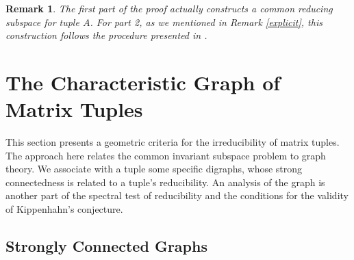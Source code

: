\documentclass[draft, 12pt, reqno]{amsart}
\numberwithin{equation}{section}
\theoremstyle{plain}
\newtheorem{remark}[theorem]{Remark}
\begin{document}
\begin{remark} \normalfont The first part of the proof actually constructs a common reducing subspace for tuple $A$. For part 2, as we mentioned in Remark \ref{explicit}, this construction follows the procedure presented in \cite{S2}.
\end{remark}
\vspace{.2cm}

\section{The Characteristic Graph of Matrix Tuples}\label{characteristic graph}

This section presents a geometric criteria for the irreducibility of matrix tuples. The approach here relates the common invariant subspace problem to graph theory. We associate with a tuple some specific digraphs, whose strong connectedness is related to a tuple's reducibility. An analysis of the graph is another part of the spectral test of reducibility and the conditions for the validity of Kippenhahn's conjecture. 


\subsection{Strongly Connected Graphs}
\end{document}
